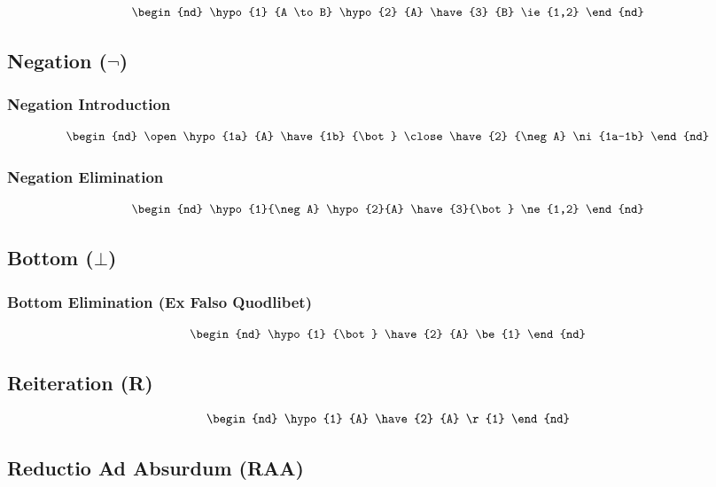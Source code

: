\documentclass[12pt,a4paper,openany]{article}
\begin{document}
\[
\begin{nd}
 \hypo{1} {A \to B}
 \hypo{2} {A}
 \have{3} {B}   \ie{1,2}
\end{nd}
\]

\subsection{Negation ($\neg$)}\label{negation}

\subsubsection{Negation Introduction}

\[
\begin{nd}
 \open
 \hypo{1a} {A}
 \have{1b} {\bot}
 \close
 \have{2} {\neg A}  \ni{1a-1b}
\end{nd}
\]

\subsubsection{Negation Elimination}

\[
\begin{nd}
 \hypo{1}{\neg A}
 \hypo{2}{A}
 \have{3}{\bot} \ne{1,2}
\end{nd}
\]

\subsection{Bottom ($\bot$)}\label{bottom}

\subsubsection{Bottom Elimination (Ex Falso Quodlibet)}
\[
\begin{nd}
 \hypo{1} {\bot}
 \have{2} {A}   \be{1}
\end{nd}
\]

\subsection{Reiteration (R)}\label{reiteration}
\[
\begin{nd}
 \hypo{1} {A}
 \have{2} {A} \r{1}
\end{nd}
\]

\subsection{Reductio Ad Absurdum (RAA)}\label{reductio-ad-absurdum-raa-nd}
\end{document}
